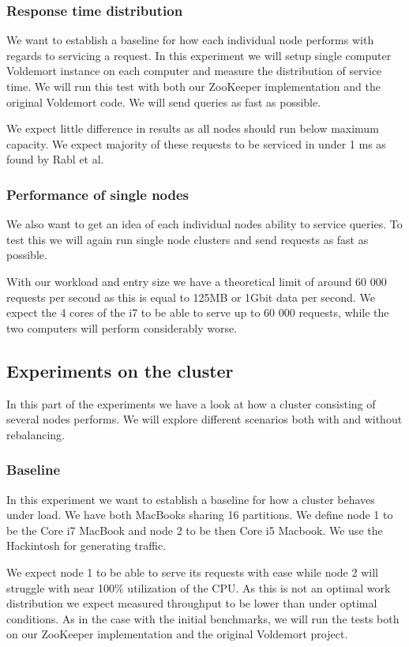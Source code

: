 \subsubsection{Response time distribution}
We want to establish a baseline for how each individual node performs with regards to servicing a request. In this experiment we will setup single computer Voldemort instance on each computer and measure the distribution of service time. We will run this test with both our ZooKeeper implementation and the original Voldemort code. We will send queries as fast as possible.

We expect little difference in results as all nodes should run below maximum capacity. We expect majority of these requests to be serviced in under 1 ms as found by Rabl et al\cite{Rabl:2012:SBD:2367502.2367512}.

\subsubsection{Performance of single nodes}
We also want to get an idea of each individual nodes ability to service queries. To test this we will again run single node clusters and send requests as fast as possible.

With our workload and entry size we have a theoretical limit of around 60 000 requests per second as this is equal to 125MB or 1Gbit data per second. We expect the 4 cores of the i7 to be able to serve up to 60 000 requests, while the two computers will perform considerably worse. 

\subsection{Experiments on the cluster}
In this part of the experiments we have a look at how a cluster consisting of several nodes performs. We will explore different scenarios both with and without rebalancing.

\subsubsection{Baseline}
In this experiment we want to establish a baseline for how a cluster behaves under load. We have both MacBooks sharing 16 partitions. We define node 1 to be the Core i7 MacBook and node 2 to be then Core i5 Macbook.  We use the Hackintosh for generating traffic. 

We expect node 1 to be able to serve its requests with ease while node 2 will struggle with near 100\% utilization of the CPU. As this is not an optimal work distribution we expect measured throughput to be lower than under optimal conditions. As in the case with the initial benchmarks, we will run the tests both on our ZooKeeper implementation and the original Voldemort project. 

